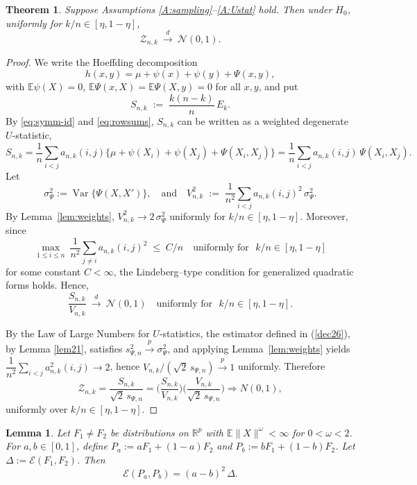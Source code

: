 \documentclass[11pt]{article}
\newtheorem{theorem}{Theorem}
\numberwithin{theorem}{section}
\newtheorem{Lemma}{Lemma}
\numberwithin{Lemma}{section}
\numberwithin{Definition}{section}
\newcommand{\Ex}{\mathbb{E}}          %
\newcommand{\Var}{\operatorname{Var}} %
\begin{document}
\begin{theorem}\label{theorem1}
Suppose Assumptions \ref{A:sampling}–\ref{A:Ustat} hold. Then under $H_0$, uniformly for $k/n\in[\eta,1-\eta]$,
\[
\mathcal{Z}_{n,k}\ \xrightarrow{d}\ \mathcal{N}(0,1).
\]
\end{theorem}


\begin{proof}
We write the Hoeffding decomposition
\[
h(x,y)=\mu+\psi(x)+\psi(y)+\Psi(x,y),
\]
with $\Ex\psi(X)=0$, $\Ex\Psi(x,X)=\Ex\Psi(X,y)=0$ for all $x,y$, and put
\[
S_{n,k} \;:=\; \frac{k(n-k)}{n}\,E_k.
\]
By \eqref{eq:symm-id} and \eqref{eq:rowsums},  $S_{n,k}$ can be written as a weighted degenerate $U$-statistic,
\[
S_{n,k}
= \frac{1}{n}\sum_{i<j} a_{n,k}(i,j)\{\mu+\psi(X_i)+\psi(X_j)+\Psi(X_i,X_j)\}
= \frac{1}{n}\sum_{i<j} a_{n,k}(i,j)\,\Psi(X_i,X_j).
\]
Let 
\[
\sigma_\Psi^2:=\Var\{\Psi(X,X')\}, \quad \text{and} \quad
V_{n,k}^2 \;:=\; \frac{1}{n^2}\sum_{i<j} a_{n,k}(i,j)^2\,\sigma_\Psi^2.
\]
By Lemma~\ref{lem:weights}, $V_{n,k}^2\to 2\,\sigma_\Psi^2$ uniformly for $k/n\in[\eta,1-\eta]$.
Moreover, since
\[
\max_{1\le i\le n}\ \frac{1}{n^2}\sum_{j\ne i} a_{n,k}(i,j)^2 \;\le\; C/n
\quad\text{uniformly for~~}k/n\in[\eta,1-\eta]
\]
for some constant $C<\infty$, the Lindeberg–type condition for generalized quadratic forms holds. Hence,
\[
\frac{S_{n,k}}{V_{n,k}} \ \xrightarrow{d}\ \mathcal{N}(0,1)
\quad\text{uniformly for~~} k/n \in[\eta,1-\eta].
\]

By the Law of Large Numbers for $U$-statistics, the estimator defined in (\ref{dec26}), by Lemma \ref{lem21}, satisfies $s_{\Psi,n}^2 \xrightarrow{p} \sigma_{\Psi}^2$, and applying Lemma~\ref{lem:weights} yields
$\dfrac{1}{n^2}\sum_{i<j}a_{n,k}^2(i,j)\to 2$, hence $V_{n,k}/(\sqrt{2}\,s_{\Psi,n})\xrightarrow{p} 1$ uniformly.
Therefore
\[
\mathcal{Z}_{n,k}
=
\frac{S_{n,k}}{\sqrt{2}\,s_{\Psi,n}}
=
\Big(\frac{S_{n,k}}{V_{n,k}}\Big)\Big(\frac{V_{n,k}}{\sqrt{2}\,s_{\Psi,n}}\Big)
\Rightarrow N(0,1),
\]
uniformly over $k/n\in[\eta,1-\eta]$.
\end{proof}



\begin{Lemma}\label{lem:ED_mixture}
Let $F_1\neq F_2$ be distributions on $\mathbb{R}^p$ with
$\mathbb{E}\|X\|^\omega<\infty$ for $0<\omega<2$.
For $a,b\in[0,1]$, define $P_a:=aF_1+(1-a)F_2$ and $P_b:=bF_1+(1-b)F_2$.
Let $\Delta:=\mathcal{E}(F_1,F_2)$.
Then
\[
\mathcal{E}(P_a,P_b)=(a-b)^2\,\Delta.
\]
\end{Lemma}
\end{document}
